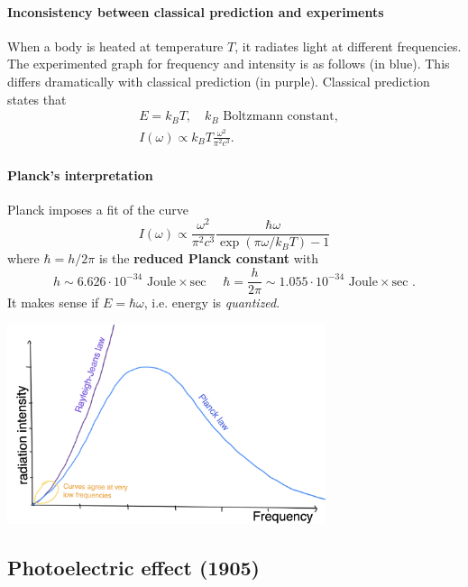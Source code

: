 \documentclass[a4paper]{article}
\begin{document}
\paragraph{Inconsistency between classical prediction and experiments}
When a body is heated at temperature $T$, it radiates light at different frequencies. The experimented graph for frequency and intensity is as follows (in blue). This differs dramatically with classical prediction (in purple). Classical prediction states that 
\begin{align*}
    &E = k_B T, \quad k_B \text{ Boltzmann constant},\\ 
    &I(\omega) \propto k_B T \frac{\omega^2}{\pi^2 c^3}. 
\end{align*}
\paragraph{Planck's interpretation}
Planck imposes a fit of the curve 
\[
    I(\omega) \propto \frac{\omega^2}{\pi^2c^3} \frac{\hbar \omega}{\exp(\pi \omega/k_B T)-1}
\]
where $ \hbar = h/2\pi $ is the \textbf{reduced Planck constant} with 
\[
    h \sim 6.626 \cdot 10^{-34} \text { Joule} \times \text {sec } \quad \hbar=\frac{h}{2 \pi} \sim 1.055 \cdot 10^{-34} \text { Joule} \times \text {sec }. 
\]
It makes sense if $ E = \hbar \omega $, i.e. energy is \textit{quantized}.
\begin{center}
    \includegraphics[width=0.7\textwidth]{qm1.png}
\end{center}

\subsection{Photoelectric effect (1905)}
\end{document}
